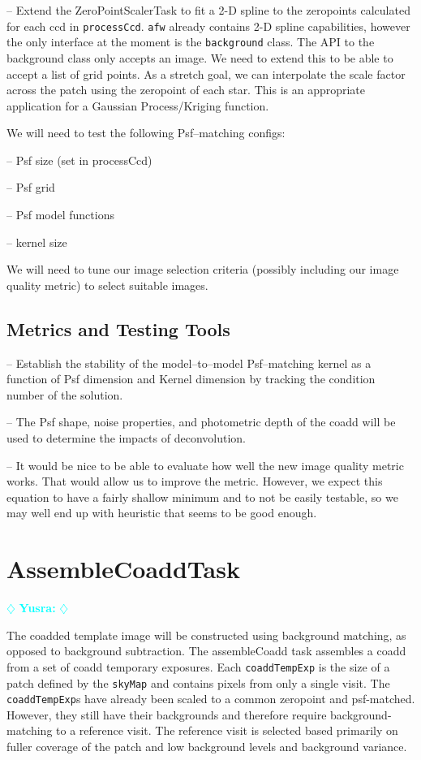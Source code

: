 \documentclass[12pt]{article}
\newcommand{\yusra} { \textcolor{cyan} {
\ensuremath{\diamondsuit} {\bf Yusra:}  
\ensuremath{\diamondsuit} } }
\begin{document}
--  Extend the ZeroPointScalerTask to fit a 2-D spline to the zeropoints calculated for each ccd in {\tt processCcd}.   {\tt afw} already contains 2-D spline capabilities, however the only interface at the moment is the {\tt background} class. The API to the background class only accepts an image. We need to extend this  to be able to accept a list of grid points.   As a stretch goal, we can  interpolate the scale factor across the patch using the zeropoint of each star. This is an appropriate application for a Gaussian Process/Kriging function. 

We will need to test the following Psf--matching configs:

-- Psf size (set in processCcd)

-- Psf grid 

-- Psf model functions

-- kernel size

We will need to tune our image selection criteria (possibly including our image quality metric)
to select suitable images.

\subsection{Metrics and Testing Tools}

-- Establish the stability of the model--to--model Psf--matching
kernel as a function of Psf dimension and Kernel dimension by tracking
the condition number of the solution.

-- The Psf shape, noise properties, and photometric depth of the coadd
will be used to determine the impacts of deconvolution.

-- It would be nice to be able to evaluate how well the new image quality metric
works. That would allow us to improve the metric. However, we expect this equation
to have a fairly shallow minimum and to not be easily testable, so we may well end up
with heuristic that seems to be good enough.


\clearpage 
\section{AssembleCoaddTask} \yusra

The coadded template image will be constructed using background
matching, as opposed to background subtraction. The assembleCoadd task assembles a coadd from a set of coadd temporary exposures.   Each {\tt coaddTempExp} is the size of a patch defined by the {\tt skyMap} and contains pixels from only a single visit.  The {\tt coaddTempExp}s have already been scaled to a common zeropoint and psf-matched.  However, they still have their backgrounds and therefore require background-matching to a reference visit. The reference visit is selected based primarily on fuller coverage of the patch and low background levels and background variance. 
\end{document}
